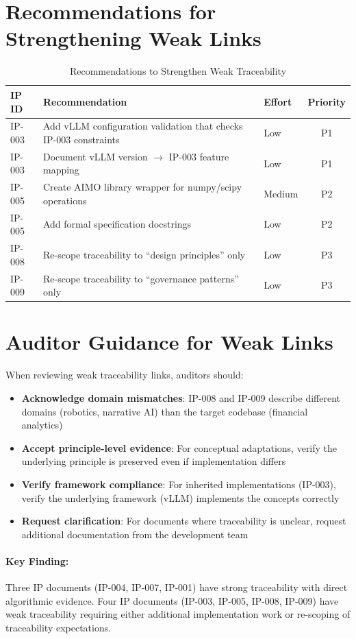 \section{Recommendations for Strengthening Weak Links}

\begin{table}[H]
\centering
\caption{Recommendations to Strengthen Weak Traceability}
\label{tab:recommendations}
\begin{tabularx}{\textwidth}{@{}lXlc@{}}
\toprule
\textbf{IP ID} & \textbf{Recommendation} & \textbf{Effort} & \textbf{Priority} \\
\midrule
IP-003 & Add vLLM configuration validation that checks IP-003 constraints & Low & P1 \\
IP-003 & Document vLLM version $\rightarrow$ IP-003 feature mapping & Low & P1 \\
IP-005 & Create AIMO library wrapper for numpy/scipy operations & Medium & P2 \\
IP-005 & Add formal specification docstrings & Low & P2 \\
IP-008 & Re-scope traceability to ``design principles'' only & Low & P3 \\
IP-009 & Re-scope traceability to ``governance patterns'' only & Low & P3 \\
\bottomrule
\end{tabularx}
\end{table}

\section{Auditor Guidance for Weak Links}

When reviewing weak traceability links, auditors should:

\begin{itemize}[nosep]
    \item \textbf{Acknowledge domain mismatches}: IP-008 and IP-009 describe different domains (robotics, narrative AI) than the target codebase (financial analytics)
    \item \textbf{Accept principle-level evidence}: For conceptual adaptations, verify the underlying principle is preserved even if implementation differs
    \item \textbf{Verify framework compliance}: For inherited implementations (IP-003), verify the underlying framework (vLLM) implements the concepts correctly
    \item \textbf{Request clarification}: For documents where traceability is unclear, request additional documentation from the development team
\end{itemize}

\paragraph{Key Finding:}
Three IP documents (IP-004, IP-007, IP-001) have strong traceability with direct algorithmic evidence. Four IP documents (IP-003, IP-005, IP-008, IP-009) have weak traceability requiring either additional implementation work or re-scoping of traceability expectations.